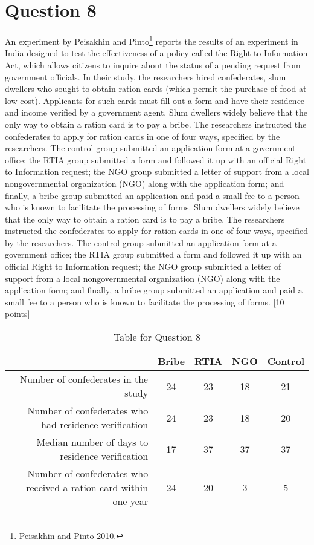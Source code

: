 \documentclass[11pt,notitlepage]{article}		%
\begin{document}
\section*{Question 8}
An experiment by Peisakhin and Pinto\footnote{Peisakhin and Pinto 2010.} reports the results of an experiment in India designed to test the effectiveness of a policy called the Right to Information Act, which allows citizens to inquire about the status of a pending request from government officials.  In their study, the researchers hired confederates, slum dwellers who sought to obtain ration cards (which permit the purchase of food at low cost).  Applicants for such cards must fill out a form and have their residence and income verified by a government agent.  Slum dwellers widely believe that the only way to obtain a ration card is to pay a bribe.  The researchers instructed the confederates to apply for ration cards in one of four ways, specified by the researchers. The control group submitted an application form at a government office; the RTIA group submitted a form and followed it up with an official Right to Information request; the NGO group submitted a letter of support from a local nongovernmental organization (NGO) along with the application form; and finally, a bribe group submitted an application and paid a small fee to a person who is known to facilitate the processing of forms. Slum dwellers widely believe that the only way to obtain a ration card is to pay a bribe.  The researchers instructed the confederates to apply for ration cards in one of four ways, specified by the researchers. The control group submitted an application form at a government office; the RTIA group submitted a form and followed it up with an official Right to Information request; the NGO group submitted a letter of support from a local nongovernmental organization (NGO) along with the application form; and finally, a bribe group submitted an application and paid a small fee to a person who is known to facilitate the processing of forms. [10 points] 

\begin{table}[H]
  \centering
  \caption{Table for Question 8}
    \begin{tabular}{rcccc}
    \toprule
          & Bribe & RTIA  & NGO   & Control \\
    \midrule
    Number of confederates in the study & 24    & 23    & 18    & 21 \\
    Number of confederates who had residence verification & 24    & 23    & 18    & 20 \\
    Median number of days to residence verification & 17    & 37    & 37    & 37 \\
    Number of confederates who received a ration card within one year & 24    & 20    & 3     & 5 \\
    \bottomrule
    \end{tabular}
\end{table}
\end{document}
